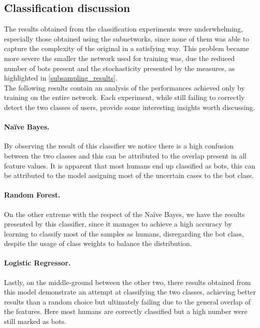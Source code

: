 \documentclass[12pt, a4paper]{article}
\begin{document}
    \subsection{Classification discussion}
    	The results obtained from the classification experiments were underwhelming, especially those obtained using the subnetworks, since none of them was able to capture the complexity of the original in a satisfying way. This problem became more severe the smaller the network used for training was, due the reduced number of bots present and the stochasticity presented by the measures, as highlighted in \ref{subsampling_results}.\\
    	The following results contain an analysis of the performances achieved only by training on the entire network. Each experiment, while still failing to correctly detect the two classes of users, provide some interesting insights worth discussing.
    	\paragraph{Na\"ive Bayes.} By observing the result of this classifier we notice there is a high confusion between the two classes and this can be attributed to the overlap present in all feature values. 
    		It is apparent that most humans end up classified as bots, this can be attributed to the model assigning most of the uncertain cases to the bot class.
    	\paragraph{Random Forest.} On the other extreme with the respect of the Na\"ive Bayes, we have the results presented by this classifier, since it manages to achieve a high accuracy by learning to classify most of the samples as humans, disregarding the bot class, despite the usage of class weights to balance the distribution.
    	\paragraph{Logistic Regressor.} Lastly, on the middle-ground between the other two, there results obtained from this model demonstrate an attempt at classifying the two classes, achieving better results than a random choice but ultimately failing due to the general overlap of the features. Here most humans are correctly classified but a high number were still marked as bots.\\
    	
\end{document}
